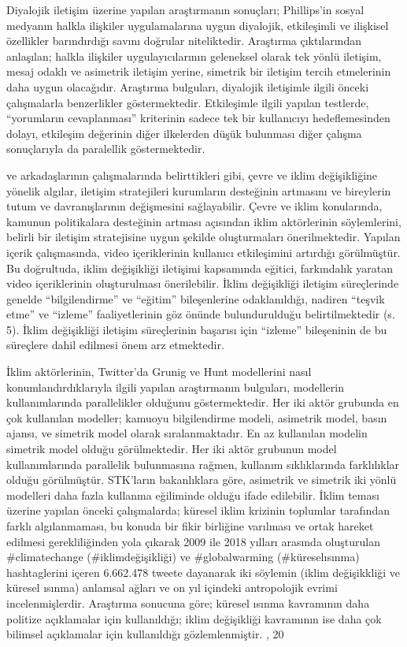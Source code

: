 \documentclass[
]{book}
\begin{document}
Diyalojik iletişim üzerine yapılan araştırmanın sonuçları; Phillips'in sosyal medyanın halkla ilişkiler uygulamalarına uygun diyalojik, etkileşimli ve ilişkisel özellikler barındırdığı savını doğrular niteliktedir. Araştırma çıktılarından anlaşılan; halkla ilişkiler uygulayıcılarının geleneksel olarak tek yönlü iletişim, mesaj odaklı ve asimetrik iletişim yerine, simetrik bir iletişim tercih etmelerinin daha uygun olacağıdır. Araştırma bulguları, diyalojik iletişimle ilgili önceki çalışmalarla benzerlikler göstermektedir. Etkileşimle ilgili yapılan testlerde, ``yorumların cevaplanması'' kriterinin sadece tek bir kullanıcıyı hedeflemesinden dolayı, etkileşim değerinin diğer ilkelerden düşük bulunması diğer çalışma sonuçlarıyla da \citep{wang2020dialogic} paralellik göstermektedir.

\citet{mahl2020bit} ve arkadaşlarının çalışmalarında belirttikleri gibi, çevre ve iklim değişikliğine yönelik algılar, iletişim stratejileri kurumların desteğinin artmasını ve bireylerin tutum ve davranışlarının değişmesini sağlayabilir. Çevre ve iklim konularında, kamunun politikalara desteğinin artması açısından iklim aktörlerinin söylemlerini, belirli bir iletişim stratejisine uygun şekilde oluşturmaları önerilmektedir. Yapılan içerik çalışmasında, video içeriklerinin kullanıcı etkileşimini artırdığı görülmüştür. Bu doğrultuda, iklim değişikliği iletişimi kapsamında eğitici, farkındalık yaratan video içeriklerinin oluşturulması önerilebilir. İklim değişikliği iletişim süreçlerinde genelde ``bilgilendirme'' ve ``eğitim'' bileşenlerine odaklanıldığı, nadiren ``teşvik etme'' ve ``izleme'' faaliyetlerinin göz önünde bulundurulduğu belirtilmektedir (s. 5). \citep{leal2019overview} İklim değişikliği iletişim süreçlerinin başarısı için ``izleme'' bileşeninin de bu süreçlere dahil edilmesi önem arz etmektedir.

İklim aktörlerinin, Twitter'da Grunig ve Hunt modellerini nasıl konumlandırdıklarıyla ilgili yapılan araştırmanın bulguları, modellerin kullanımlarında parallelikler olduğunu göstermektedir. Her iki aktör grubunda en çok kullanılan modeller; kamuoyu bilgilendirme modeli, asimetrik model, basın ajansı, ve simetrik model olarak sıralanmaktadır. En az kullanılan modelin simetrik model olduğu görülmektedir. Her iki aktör grubunun model kullanımlarında parallelik bulunmasına rağmen, kullanım sıklıklarında farklılıklar olduğu görülmüştür. STK'ların bakanlıklara göre, asimetrik ve simetrik iki yönlü modelleri daha fazla kullanma eğiliminde olduğu ifade edilebilir.
İklim teması üzerine yapılan önceki çalışmalarda; küresel iklim krizinin toplumlar tarafından farklı algılanmaması, bu konuda bir fikir birliğine varılması ve ortak hareket edilmesi gerekliliğinden yola çıkarak 2009 ile 2018 yılları arasında oluşturulan \#climatechange (\#iklimdeğişikliği) ve \#globalwarming (\#küreselısınma) hashtaglerini içeren 6.662.478 tweete dayanarak iki söylemin (iklim değişikkliği ve küresel ısınma) anlamsal ağları ve on yıl içindeki antropolojik evrimi incelenmişlerdir. Araştırma sonucuna göre; küresel ısınma kavramının daha politize açıklamalar için kullanıldığı; iklim değişikliği kavramının ise daha çok bilimsel açıklamalar için kullanıldığı gözlemlenmiştir. , 20 \citep{shi2020climatechange}
\end{document}
